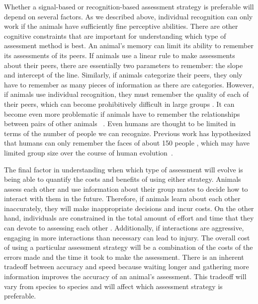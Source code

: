 Whether a signal-based or recognition-based assessment strategy is preferable will depend on several factors. As we described above, individual recognition can only work if the animals have sufficiently fine perceptive abilities. There are other cognitive constraints that are important for understanding which type of assessment method is best. An animal's memory can limit its ability to remember its assessments of its peers. 
If animals use a linear rule to make assessments about their peers, there are essentially two parameters to remember: the slope and intercept of the line. Similarly, if animals categorize their peers, they only have to remember as many pieces of information as there are categories. However, if animals use individual recognition, they must remember the quality of each of their peers, which can become prohibitively difficult in large groups  \citep{Rohwer:1982fk,Solberg:1997uq}. It can become even more problematic if animals have to remember the relationships between pairs of other animals ~\citep{Seyfarth2015SocialCognition}. Even humans are thought to be limited in terms of the number of people we can recognize. Previous work has hypothesized that humans can only remember the faces of about 150 people \citep{Dunbar:1993zr,Hill:2003ly}, which may have limited group size over the course of human evolution~\citep{Dunbar:1992ys,Dunbar:1993zr}. 

The final factor in understanding when which type of assessment will evolve is being able to quantify the costs and benefits of using either strategy. Animals assess each other and use information about their group mates to decide how to interact with them in the future. Therefore, if animals learn about each other inaccurately, they will make inappropriate decisions and incur costs. On the other hand, individuals are constrained in the total amount of effort and time that they can devote to assessing each other \citep{MacIver:2010ve}. Additionally, if interactions are aggressive, engaging in more interactions than necessary can lead to injury. The overall cost of using a particular assessment strategy will be a combination of the costs of the errors made and the time it took to make the assessment. There is an inherent tradeoff between accuracy and speed because waiting longer and gathering more information improves the accuracy of an animal's assessment.  This tradeoff will vary from species to species and will affect which assessment strategy is preferable.  

